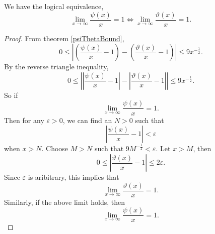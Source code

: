 \documentclass{unswmaths}
\begin{document}
\begin{theorem}
    We have the logical equivalence,
    \begin{equation*}
        \lim_{x\rightarrow\infty} \frac{\psi(x)}{x} = 1 \Longleftrightarrow \lim_{x\rightarrow\infty} \frac{\vartheta(x)}{x} = 1.
    \end{equation*}
\end{theorem}
\begin{proof}
    From theorem \ref{psiThetaBound}, 
    \begin{equation*}
        0 \leq \left| \left(\frac{\psi(x)}{x}-1\right)-\left(\frac{\vartheta(x)}{x}-1\right)\right| \leq 9x^{-\frac{1}{2}}.
    \end{equation*}
    By the reverse triangle inequality,
    \begin{equation*}
        0 \leq \left| \left|\frac{\psi(x)}{x}-1\right|-\left|\frac{\vartheta(x)}{x}-1\right|\right| \leq 9x^{-\frac{1}{2}}.
    \end{equation*}
    So if
    \begin{equation*}
        \lim_{x\rightarrow\infty} \frac{\psi(x)}{x} = 1.
    \end{equation*}
    Then for any $\varepsilon > 0$, we can find an $N > 0$ such that
    \begin{equation*}
        \left|\frac{\psi(x)}{x}-1\right| < \varepsilon
    \end{equation*}
    when $x > N$. Choose $M > N$ such that $9M^{-\frac{1}{2}} < \varepsilon$. Let $x > M$, then
    \begin{equation*}
        0 \leq \left| \frac{\vartheta(x)}{x}-1\right| \leq 2\varepsilon.
    \end{equation*}
    Since $\varepsilon$ is aribitrary, this implies that
    \begin{equation*}
        \lim_{x\rightarrow\infty} \frac{\vartheta(x)}{x} = 1.
    \end{equation*}
    Similarly, if the above limit holds, then
    \begin{equation*}
        \lim_{x\rightarrow\infty} \frac{\psi(x)}{x} = 1.
    \end{equation*}
\end{proof}
\end{document}
